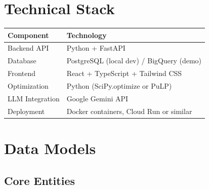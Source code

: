 \documentclass[11pt]{article}
\begin{document}
\section{Technical Stack}

\begin{center}
\begin{tabular}{ll}
\toprule
\textbf{Component} & \textbf{Technology} \\
\midrule
Backend API & Python + FastAPI \\
Database & PostgreSQL (local dev) / BigQuery (demo) \\
Frontend & React + TypeScript + Tailwind CSS \\
Optimization & Python (SciPy.optimize or PuLP) \\
LLM Integration & Google Gemini API \\
Deployment & Docker containers, Cloud Run or similar \\
\bottomrule
\end{tabular}
\end{center}

\section{Data Models}

\subsection{Core Entities}
\end{document}
